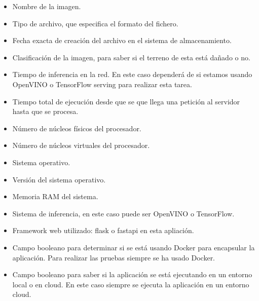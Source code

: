 \begin{itemize}
    \item Nombre de la imagen.
    \item Tipo de archivo, que especifica el formato del fichero.
    \item Fecha exacta de creación del archivo en el sistema de almacenamiento.
    \item Clasificación de la imagen, para saber si el terreno de esta está dañado o no.
    \item Tiempo de inferencia en la red.
    En este caso dependerá de si estamos usando OpenVINO o TensorFlow serving para realizar esta tarea.
    \item Tiempo total de ejecución desde que se que llega una petición al servidor hasta que se procesa.
    \item Número de núcleos físicos del procesador.
    \item Número de núcleos virtuales del procesador.
    \item Sistema operativo.
    \item Versión del sistema operativo.
    \item Memoria RAM del sistema.
    \item Sistema de inferencia, en este caso puede ser OpenVINO o TensorFlow.
    \item Framework web utilizado: flask o fastapi en esta apliación.
    \item Campo booleano para determinar si se está usando Docker para encapsular la aplicación.
    Para realizar las pruebas siempre se ha usado Docker.
    \item Campo booleano para saber si la aplicación se está ejecutando en un entorno local o en cloud.
    En este caso siempre se ejecuta la aplicación en un entorno cloud.
\end{itemize}


